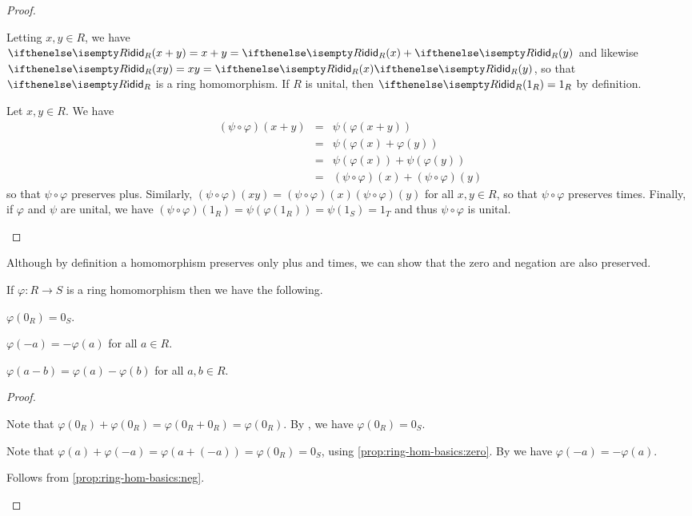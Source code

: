 \begin{proof}
\begin{inlineproplist}
\item Letting \(x,y \in R\), we have \(\ID[R](x+y) = x+y = \ID[R](x) + \ID[R](y)\) and likewise \(\ID[R](xy) = xy = \ID[R](x)\ID[R](y)\), so that \(\ID[R]\) is a ring homomorphism.
If \(R\) is unital, then \(\ID[R](1_R) = 1_R\) by definition.
\item Let \(x,y \in R\).
We have
\begin{eqnarray*}
(\psi \circ \varphi)(x+y)
 & = & \psi(\varphi(x+y)) \\
 & = & \psi(\varphi(x) + \varphi(y)) \\
 & = & \psi(\varphi(x)) + \psi(\varphi(y)) \\
 & = & (\psi \circ \varphi)(x) + (\psi \circ \varphi)(y)
\end{eqnarray*}
so that \(\psi \circ \varphi\) preserves plus.
Similarly, \((\psi \circ \varphi)(xy) = (\psi \circ \varphi)(x)(\psi \circ \varphi)(y)\) for all \(x,y \in R\), so that \(\psi \circ \varphi\) preserves times.
Finally, if \(\varphi\) and \(\psi\) are unital, we have \((\psi \circ \varphi)(1_R) = \psi(\varphi(1_R)) = \psi(1_S) = 1_T\) and thus \(\psi \circ \varphi\) is unital.
\end{inlineproplist}
\end{proof}

Although by definition a homomorphism preserves only plus and times, we can show that the zero and negation are also preserved.

\begin{prop} \label{prop:ring-hom-basics}
If \(\varphi : R \rightarrow S\) is a ring homomorphism then we have the following.
\begin{proplist}
\item \label{prop:ring-hom-basics:zero} \(\varphi(0_R) = 0_S\).
\item \label{prop:ring-hom-basics:neg} \(\varphi(-a) = -\varphi(a)\) for all \(a \in R\).
\item \label{prop:ring-hom-basics:minus} \(\varphi(a-b) = \varphi(a) - \varphi(b)\) for all \(a,b \in R\).
\end{proplist}
\end{prop}

\begin{proof}
\begin{inlineproplist}
\item Note that \(\varphi(0_R) + \varphi(0_R) = \varphi(0_R + 0_R) = \varphi(0_R)\).
By , we have \(\varphi(0_R) = 0_S\).
\item Note that \(\varphi(a) + \varphi(-a) = \varphi(a + (-a)) = \varphi(0_R) = 0_S\), using \ref{prop:ring-hom-basics:zero}.
By  we have \(\varphi(-a) = -\varphi(a)\).
\item Follows from \ref{prop:ring-hom-basics:neg}.
\end{inlineproplist}
\end{proof}

